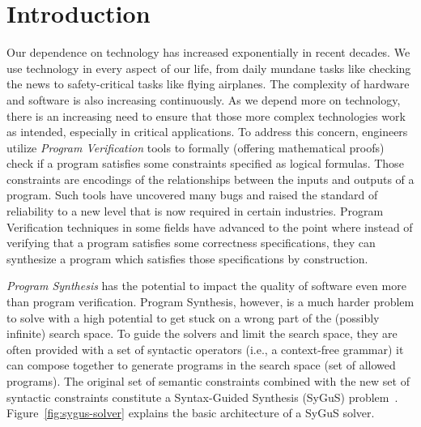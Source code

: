 \section{Introduction}
\label{sec:introduction}
Our dependence on technology has increased exponentially in recent decades.
%
We use technology in every aspect of our life, from daily mundane tasks like checking the news to safety-critical tasks like flying airplanes.
%
The complexity of hardware and software is also increasing continuously.
%
As we depend more on technology, there is an increasing need to ensure that those more complex technologies work as intended, especially in critical applications.
%
To address this concern, engineers utilize \emph{Program Verification} tools
%
to formally (offering mathematical proofs) check if a program satisfies some constraints specified as logical formulas.
%
Those constraints are encodings of the relationships between the inputs and outputs of a program.
%
Such tools have uncovered many bugs and raised the standard of reliability to a new level that is now required in certain industries.
%
Program Verification techniques in some fields have advanced to the point where instead of verifying that a program satisfies some correctness specifications,
%
they can synthesize a program which satisfies those specifications by construction.

\emph{Program Synthesis} has the potential to impact the quality of software even more than program verification.
Program Synthesis, however, is a much harder problem to solve with a high potential to get stuck on a wrong part of the (possibly infinite) search space.
%
To guide the solvers and limit the search space, they are often provided with a set of syntactic operators (i.e., a context-free grammar) it can compose together to generate programs in the search space (set of allowed programs).
%
The original set of semantic constraints combined with the new set of syntactic constraints constitute a Syntax-Guided Synthesis (SyGuS) problem~\cite{sygus:2013}. Figure~\ref{fig:sygus-solver} explains the basic architecture of a SyGuS solver.


